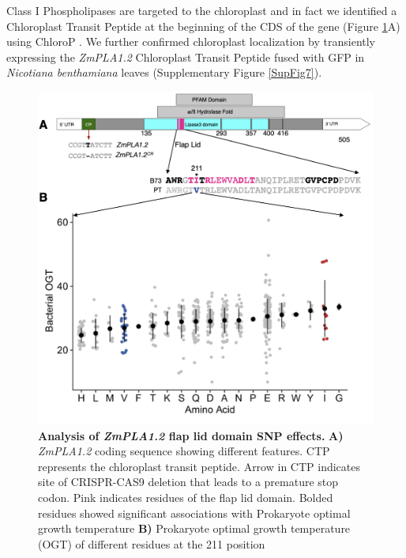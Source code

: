 \documentclass[9pt,twocolumn,twoside,lineno]{BioRxiv}
\begin{document}
Class I Phospholipases are targeted to the chloroplast and in fact we identified a Chloroplast Transit Peptide at the beginning of the CDS of the gene (Figure \ref{Fig5}A) using ChloroP \cite{Emanuelsson1999-rs}.
We further confirmed chloroplast localization by transiently expressing  the \textit{ZmPLA1.2} Chloroplast Transit Peptide fused with GFP in \textit{Nicotiana benthamiana} leaves (Supplementary Figure \ref{SupFig7}).

\begin{figure}[!ht]
\begin{center}
\includegraphics[width=0.4\paperwidth]{Figures/Fig_5.png}
\caption{\textbf{Analysis of \textit{ZmPLA1.2} flap lid domain SNP effects.}  
\textbf{A)} \textit{ZmPLA1.2} coding sequence showing different features. 
CTP represents the chloroplast transit peptide. 
Arrow in CTP indicates site of CRISPR-CAS9 deletion that leads to a premature stop codon.
Pink indicates residues of the flap lid domain.
Bolded residues showed significant associations with Prokaryote optimal growth temperature 
\textbf{B)} Prokaryote optimal growth temperature (OGT) of different residues at the 211 position}
\label{Fig5}
\end{center}
\end{figure}
\end{document}
